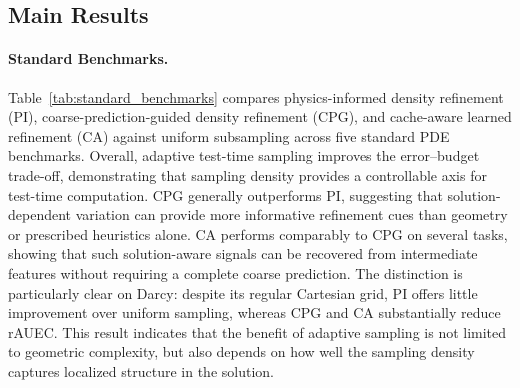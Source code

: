 \documentclass{article}
\begin{document}

\subsection{Main Results}
\label{sec:main_results}

\paragraph{Standard Benchmarks.}
Table~\ref{tab:standard_benchmarks} compares physics-informed density
refinement (PI), coarse-prediction-guided density refinement (CPG), and
cache-aware learned refinement (CA) against uniform subsampling across five
standard PDE benchmarks. Overall, adaptive test-time sampling improves the
error--budget trade-off, demonstrating that sampling density provides a
controllable axis for test-time computation. CPG generally outperforms PI,
suggesting that solution-dependent variation can provide more informative
refinement cues than geometry or prescribed heuristics alone. CA performs
comparably to CPG on several tasks, showing that such solution-aware signals
can be recovered from intermediate features without requiring a complete
coarse prediction. The distinction is particularly clear on Darcy: despite its
regular Cartesian grid, PI offers little improvement over uniform sampling,
whereas CPG and CA substantially reduce rAUEC. This result indicates that the
benefit of adaptive sampling is not limited to geometric complexity, but also
depends on how well the sampling density captures localized structure in the
solution.
\end{document}
